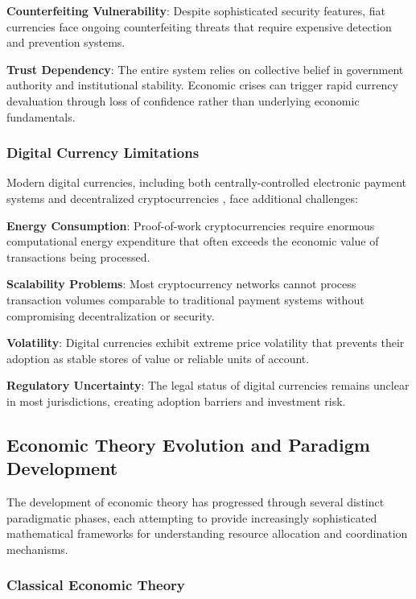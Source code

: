 \documentclass[12pt,a4paper]{article}
\begin{document}
\textbf{Counterfeiting Vulnerability}: Despite sophisticated security features, fiat currencies face ongoing counterfeiting threats that require expensive detection and prevention systems.

\textbf{Trust Dependency}: The entire system relies on collective belief in government authority and institutional stability. Economic crises can trigger rapid currency devaluation through loss of confidence rather than underlying economic fundamentals.

\subsubsection{Digital Currency Limitations}

Modern digital currencies, including both centrally-controlled electronic payment systems and decentralized cryptocurrencies \cite{nakamoto2008,chaum1983}, face additional challenges:

\textbf{Energy Consumption}: Proof-of-work cryptocurrencies require enormous computational energy expenditure that often exceeds the economic value of transactions being processed.

\textbf{Scalability Problems}: Most cryptocurrency networks cannot process transaction volumes comparable to traditional payment systems without compromising decentralization or security.

\textbf{Volatility}: Digital currencies exhibit extreme price volatility that prevents their adoption as stable stores of value or reliable units of account.

\textbf{Regulatory Uncertainty}: The legal status of digital currencies remains unclear in most jurisdictions, creating adoption barriers and investment risk.

\subsection{Economic Theory Evolution and Paradigm Development}

The development of economic theory has progressed through several distinct paradigmatic phases, each attempting to provide increasingly sophisticated mathematical frameworks for understanding resource allocation and coordination mechanisms.

\subsubsection{Classical Economic Theory}
\end{document}
